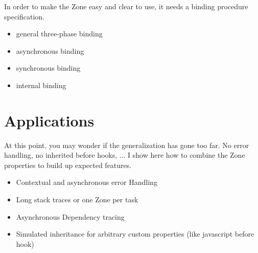 In order to make the Zone easy and clear to use, it needs a binding procedure specification.

\begin{itemize}
\item general three-phase binding
\item asynchronous binding
\item synchronous binding
\item internal binding
\end{itemize}

\section{Applications}

At this point, you may wonder if the generalization has gone too far. No error handling, no inherited before hooks, ... I show here how to combine the Zone properties to build up expected features.

\begin{itemize}
\item Contextual and asynchronous error Handling
\item Long stack traces or one Zone per task
\item Asynchronous Dependency tracing
\item Simulated inheritance for arbitrary custom properties (like javascript before hook)
\end{itemize}